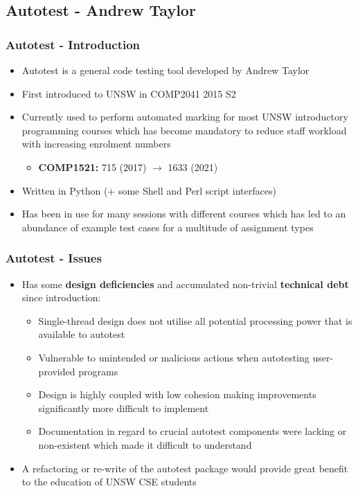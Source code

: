 \documentclass[xcolor, handout]{beamer}
\begin{document}
\subsection{Autotest - Andrew Taylor}
\begin{frame}
	\frametitle{Autotest - Introduction}
	\begin{itemize}
		\setlength\itemsep{1em}
		\item Autotest is a general code testing tool developed by Andrew Taylor
			\pause
		\item First introduced to UNSW in COMP2041 2015 S2
			\pause
		\item Currently used to perform automated marking for most UNSW introductory programming courses which has become mandatory to reduce staff workload with increasing enrolment numbers
			\begin{itemize}
				\item \textbf{COMP1521:} 715 (2017) $\rightarrow$ 1633 (2021)
			\end{itemize}
			\pause
		\item Written in Python (+ some Shell and Perl script interfaces)
			\pause
		\item Has been in use for many sessions with different courses which has led to an abundance of example test cases for a multitude of assignment types
	\end{itemize}
\end{frame}
\begin{frame}
	\frametitle{Autotest - Issues}
	\begin{itemize}
		\setlength\itemsep{1em}
		\item Has some \textbf{design deficiencies} and accumulated non-trivial \textbf{technical debt} since introduction:
		\begin{itemize}
			\setlength\itemsep{0.5em}
			\item Single-thread design does not utilise all potential processing power that is available to autotest
				\pause
			\item Vulnerable to unintended or malicious actions when autotesting user-provided programs
				\pause
			\item Design is highly coupled with low cohesion making improvements significantly more difficult to implement
				\pause
			\item Documentation in regard to crucial autotest components were lacking or non-existent which made it difficult to understand
				\pause
		\end{itemize}
		\item A refactoring or re-write of the autotest package would provide great benefit to the education of UNSW CSE students
	\end{itemize}
\end{frame}
\end{document}
